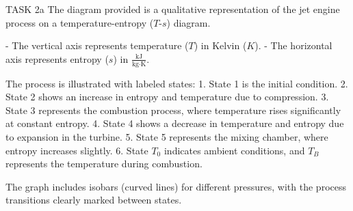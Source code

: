 TASK 2a  
The diagram provided is a qualitative representation of the jet engine process on a temperature-entropy (\( T \)-\( s \)) diagram.  

- The vertical axis represents temperature (\( T \)) in Kelvin (\( K \)).  
- The horizontal axis represents entropy (\( s \)) in \( \frac{\text{kJ}}{\text{kg·K}} \).  

The process is illustrated with labeled states:  
1. State 1 is the initial condition.  
2. State 2 shows an increase in entropy and temperature due to compression.  
3. State 3 represents the combustion process, where temperature rises significantly at constant entropy.  
4. State 4 shows a decrease in temperature and entropy due to expansion in the turbine.  
5. State 5 represents the mixing chamber, where entropy increases slightly.  
6. State \( T_0 \) indicates ambient conditions, and \( T_B \) represents the temperature during combustion.  

The graph includes isobars (curved lines) for different pressures, with the process transitions clearly marked between states.